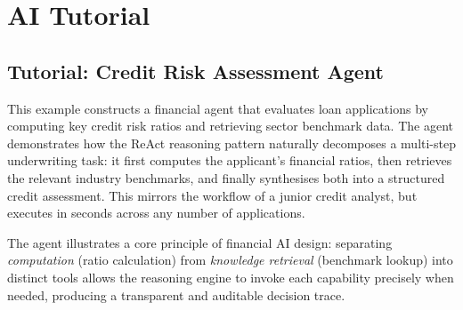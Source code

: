 \documentclass{article}
\begin{document}
\section{AI Tutorial}
\subsection*{Tutorial: Credit Risk Assessment Agent}

This example constructs a financial agent that evaluates loan applications by computing key credit risk ratios and retrieving sector benchmark data. The agent demonstrates how the ReAct reasoning pattern naturally decomposes a multi-step underwriting task: it first computes the applicant's financial ratios, then retrieves the relevant industry benchmarks, and finally synthesises both into a structured credit assessment. This mirrors the workflow of a junior credit analyst, but executes in seconds across any number of applications.

The agent illustrates a core principle of financial AI design: separating \textit{computation} (ratio calculation) from \textit{knowledge retrieval} (benchmark lookup) into distinct tools allows the reasoning engine to invoke each capability precisely when needed, producing a transparent and auditable decision trace.
\end{document}
